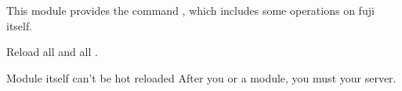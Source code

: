 
This module provides the command , which includes some operations on fuji itself.

Reload all  and all .

\begin{note}{Module itself can't be hot reloaded}
    After you  or  a module, you must  your server.
\end{note}


